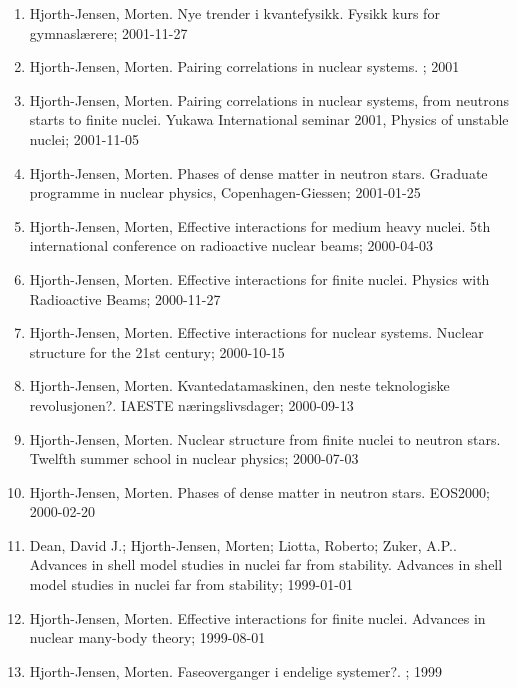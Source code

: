 \documentclass[a4wide,10pt]{article}
\begin{document}
\begin{enumerate}
\item Hjorth-Jensen, Morten. Nye trender i kvantefysikk. Fysikk kurs for gymnaslærere; 2001-11-27

\item Hjorth-Jensen, Morten. Pairing correlations in nuclear systems. ; 2001

\item Hjorth-Jensen, Morten. Pairing correlations in nuclear systems, from neutrons starts to finite nuclei. Yukawa International seminar 2001, Physics of unstable nuclei; 2001-11-05

\item Hjorth-Jensen, Morten. Phases of dense matter in neutron stars. Graduate programme in nuclear physics, Copenhagen-Giessen; 2001-01-25

\item Hjorth-Jensen, Morten, Effective interactions for medium heavy nuclei. 5th international conference on radioactive nuclear beams; 2000-04-03

\item Hjorth-Jensen, Morten. Effective interactions for finite nuclei. Physics with Radioactive Beams; 2000-11-27

\item Hjorth-Jensen, Morten. Effective interactions for nuclear systems. Nuclear structure for the 21st century; 2000-10-15

\item Hjorth-Jensen, Morten. Kvantedatamaskinen, den neste teknologiske revolusjonen?. IAESTE næringslivsdager; 2000-09-13

\item Hjorth-Jensen, Morten. Nuclear structure from finite nuclei to neutron stars. Twelfth summer school in nuclear physics; 2000-07-03

\item Hjorth-Jensen, Morten. Phases of dense matter in neutron stars. EOS2000; 2000-02-20

\item Dean, David J.; Hjorth-Jensen, Morten; Liotta, Roberto; Zuker, A.P.. Advances in shell model studies in nuclei far from stability. Advances in shell model studies in nuclei far from stability; 1999-01-01

\item Hjorth-Jensen, Morten. Effective interactions for finite nuclei. Advances in nuclear many-body theory; 1999-08-01

\item Hjorth-Jensen, Morten.  Faseoverganger i endelige systemer?. ; 1999


\end{enumerate}
\end{document}
